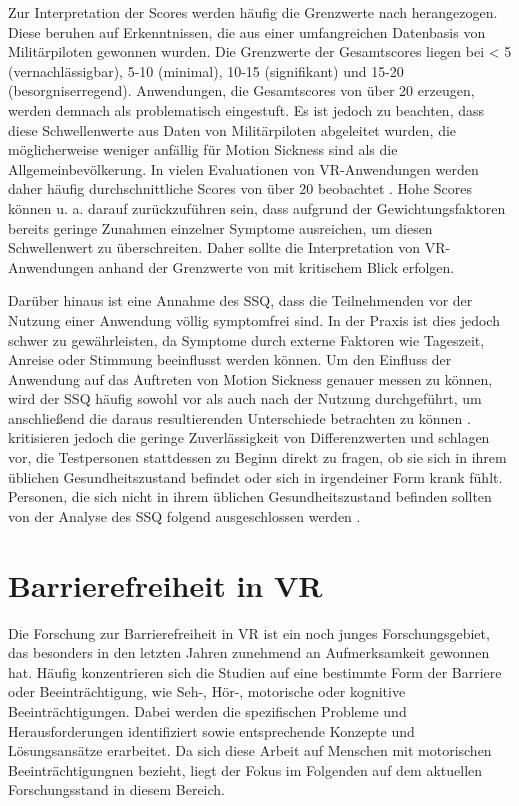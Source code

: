 Zur Interpretation der Scores werden häufig die Grenzwerte nach \citet{stanney_cybersickness_1997} herangezogen. Diese beruhen auf Erkenntnissen, die aus einer umfangreichen Datenbasis von Militärpiloten gewonnen wurden. Die Grenzwerte der Gesamtscores liegen bei < 5 (vernachlässigbar), 5-10 (minimal), 10-15 (signifikant) und 15-20 (besorgniserregend). Anwendungen, die Gesamtscores von über 20 erzeugen, werden demnach als problematisch eingestuft. Es ist jedoch zu beachten, dass diese Schwellenwerte aus Daten von Militärpiloten abgeleitet wurden, die möglicherweise weniger anfällig für Motion Sickness sind als die Allgemeinbevölkerung. In vielen Evaluationen von VR-Anwendungen werden daher häufig durchschnittliche Scores von über 20 beobachtet \citep{bimberg_usage_2020}. Hohe Scores können u. a. darauf zurückzuführen sein, dass aufgrund der Gewichtungsfaktoren bereits geringe Zunahmen einzelner Symptome ausreichen, um diesen Schwellenwert zu überschreiten. Daher sollte die Interpretation von VR-Anwendungen anhand der Grenzwerte von \citet{stanney_cybersickness_1997} mit kritischem Blick erfolgen. 

Darüber hinaus ist eine Annahme des SSQ, dass die Teilnehmenden vor der Nutzung einer Anwendung völlig symptomfrei sind. In der Praxis ist dies jedoch schwer zu gewährleisten, da Symptome durch externe Faktoren wie Tageszeit, Anreise oder Stimmung beeinflusst werden können. Um den Einfluss der Anwendung auf das Auftreten von Motion Sickness genauer messen zu können, wird der SSQ häufig sowohl vor als auch nach der Nutzung durchgeführt, um anschließend die daraus resultierenden Unterschiede betrachten zu können \citep{bimberg_usage_2020}. \citet{kennedy_simulator_1993} kritisieren jedoch die geringe Zuverlässigkeit von Differenzwerten und schlagen vor, die Testpersonen stattdessen zu Beginn direkt zu fragen, ob sie sich in ihrem üblichen Gesundheitszustand befindet oder sich in irgendeiner Form krank fühlt. Personen, die sich nicht in ihrem üblichen Gesundheitszustand befinden sollten von der Analyse des SSQ folgend ausgeschlossen werden \citep{jerald_vr_2016}.

\section{Barrierefreiheit in VR} 

Die Forschung zur Barrierefreiheit in VR ist ein noch junges Forschungsgebiet, das besonders in den letzten Jahren zunehmend an Aufmerksamkeit gewonnen hat. Häufig konzentrieren sich die Studien auf eine bestimmte Form der Barriere oder Beeinträchtigung, wie Seh-, Hör-, motorische oder kognitive Beeinträchtigungen. Dabei werden die spezifischen Probleme und Herausforderungen identifiziert sowie entsprechende Konzepte und Lösungsansätze erarbeitet. Da sich diese Arbeit auf Menschen mit motorischen Beeinträchtigungnen bezieht, liegt der Fokus im Folgenden auf dem aktuellen Forschungsstand in diesem Bereich.

